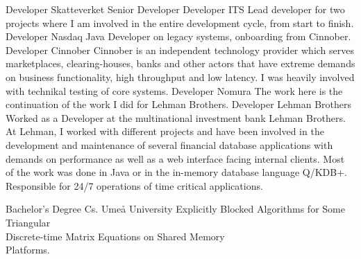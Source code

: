 \documentclass[9pt]{developercv} %
\begin{document}
\begin{entrylist}
		{Developer}
		{Skatteverket}
		{Senior Developer }
        {Developer}
        {ITS}
        {Lead developer for two projects where I am involved 
		in the entire development cycle, from start to finish.}
        {Developer}    
        {Nasdaq}
        {Java Developer on legacy systems, onboarding from Cinnober.}
		{Developer}
		{Cinnober}
		{Cinnober is an independent technology provider which serves marketplaces, clearing-houses,
        banks and other actors that have extreme demands on business functionality, high throughput
         and low latency. I was heavily involved with technikal testing of core systems.}
		{Developer}
		{Nomura}
		{The work here is the continuation of the work I did for Lehman Brothers.}
		{Developer}
		{Lehman Brothers}
        {Worked as a Developer at the multinational investment
        bank Lehman Brothers.  At Lehman, I worked
        with different projects and have been involved in the development
        and  maintenance of several financial database applications with
         demands on performance as well as a web interface facing 
         internal clients. Most of the work was done in Java or 
         in the in-memory database language Q/KDB+. \\
         Responsible for 24/7 operations of time critical applications.} \raggedright
		\end{entrylist}

\vspace{-12pt}
\raggedright
\begin{entrylist}
		{Bachelor's Degree Cs.}
		{Umeå University}
		{Explicitly Blocked Algorithms for Some 
        Triangular \\ Discrete-time Matrix Equations on 
        Shared Memory \\ Platforms.}
\end{entrylist}
\end{document}
